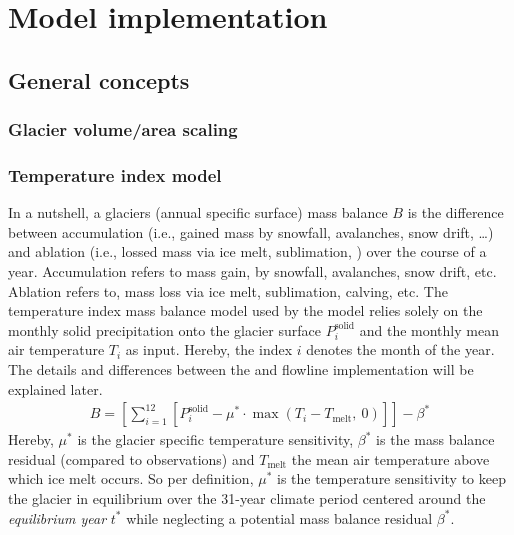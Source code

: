 \chapter{Model implementation}\label{chap:methods}
\thispagestyle{plain}

\section{General concepts} %
\label{sec:general_concepts}



    \subsection{Glacier volume/area scaling} %
    \label{sub:glacier_volume_area_scaling}
    

    \subsection{Temperature index model} %
    \label{sub:temperature_index_model}

        In a nutshell, a glaciers (annual specific surface) mass balance $B$ is the difference between accumulation (i.e., gained mass by snowfall, avalanches, snow drift, \ldots) and ablation (i.e., lossed mass via ice melt, sublimation, ) over the course of a year. Accumulation refers to mass gain, by snowfall, avalanches, snow drift, etc. Ablation refers to, mass loss via ice melt, sublimation, calving, etc. The temperature index mass balance model used by the \vas{} model relies solely on the monthly solid precipitation onto the glacier surface $P_i^{\text{solid}}$ and the monthly mean air temperature $T_i^{\text{}}$ as input. Hereby, the index $i$ denotes the month of the year. The details and differences between the \vas{} and flowline implementation will be explained later. 
        \begin{align} \label{eq:mass-balance}
        B = \left[\sum_{i=1}^{12}\left[
                    P_{i}^{\text{solid}} 
                    - \mu^* \cdot
                            \max\left(T_{i}^{\text{}}
                            - T_{\text{melt}},\ 0\right)
            \right]\right] - \beta^*
        \end{align}
        Hereby, $\mu^*$ is the glacier specific temperature sensitivity, $\beta^*$ is the mass balance residual (compared to observations) and $T_{\text{melt}}$ the mean air temperature above which ice melt occurs. So per definition, $\mu^*$ is the temperature sensitivity to keep the glacier in equilibrium over the 31-year climate period centered around the \textit{equilibrium year} $t^*$ while neglecting a potential mass balance residual $\beta^*$.

